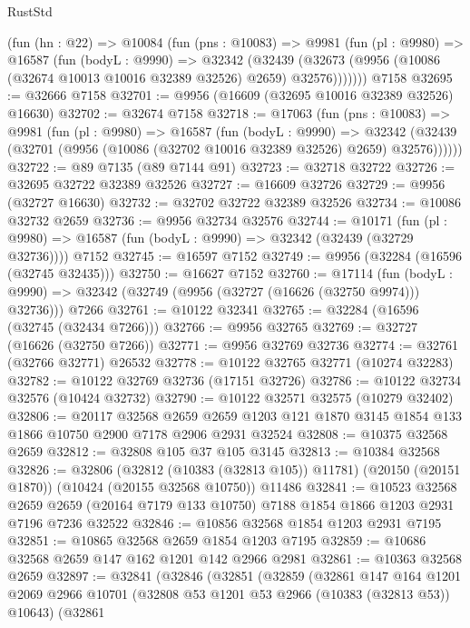 \begin{lexlean}{RustStd}
\begin{coremodule}
    (fun (hn : @22) =>
    @10084
      (fun (pns : @10083) =>
      @9981
        (fun (pl : @9980) =>
        @16587
          (fun (bodyL : @9990) =>
          @32342
            (@32439 (@32673 (@9956 (@10086 (@32674 @10013 @10016 @32389 @32526) @2659) @32576)))))))
    @7158
@32695 := @32666 @7158
@32701 := @9956 (@16609 (@32695 @10016 @32389 @32526) @16630)
@32702 := @32674 @7158
@32718 := @17063
    (fun (pns : @10083) =>
    @9981
      (fun (pl : @9980) =>
      @16587
        (fun (bodyL : @9990) =>
        @32342 (@32439 (@32701 (@9956 (@10086 (@32702 @10016 @32389 @32526) @2659) @32576))))))
@32722 := @89 @7135 (@89 @7144 @91)
@32723 := @32718 @32722
@32726 := @32695 @32722 @32389 @32526
@32727 := @16609 @32726
@32729 := @9956 (@32727 @16630)
@32732 := @32702 @32722 @32389 @32526
@32734 := @10086 @32732 @2659
@32736 := @9956 @32734 @32576
@32744 := @10171
    (fun (pl : @9980) => @16587 (fun (bodyL : @9990) => @32342 (@32439 (@32729 @32736))))
    @7152
@32745 := @16597 @7152
@32749 := @9956 (@32284 (@16596 (@32745 @32435)))
@32750 := @16627 @7152
@32760 := @17114
    (fun (bodyL : @9990) => @32342 (@32749 (@9956 (@32727 (@16626 (@32750 @9974))) @32736)))
    @7266
@32761 := @10122 @32341
@32765 := @32284 (@16596 (@32745 (@32434 @7266)))
@32766 := @9956 @32765
@32769 := @32727 (@16626 (@32750 @7266))
@32771 := @9956 @32769 @32736
@32774 := @32761 (@32766 @32771) @26532
@32778 := @10122 @32765 @32771 (@10274 @32283)
@32782 := @10122 @32769 @32736 (@17151 @32726)
@32786 := @10122 @32734 @32576 (@10424 @32732)
@32790 := @10122 @32571 @32575 (@10279 @32402)
@32806 := @20117
    @32568
    @2659
    @2659
    @1203
    @121
    @1870
    @3145
    @1854
    @133
    @1866
    @10750
    @2900
    @7178
    @2906
    @2931
    @32524
@32808 := @10375 @32568 @2659
@32812 := @32808 @105 @37 @105 @3145
@32813 := @10384 @32568
@32826 := @32806
    (@32812 (@10383 (@32813 @105)) @11781)
    (@20150 (@20151 @1870))
    (@10424 (@20155 @32568 @10750))
    @11486
@32841 := @10523
    @32568
    @2659
    @2659
    (@20164 @7179 @133 @10750)
    @7188
    @1854
    @1866
    @1203
    @2931
    @7196
    @7236
    @32522
@32846 := @10856 @32568 @1854 @1203 @2931 @7195
@32851 := @10865 @32568 @2659 @1854 @1203 @7195
@32859 := @10686 @32568 @2659 @147 @162 @1201 @142 @2966 @2981
@32861 := @10363 @32568 @2659
@32897 := @32841
    (@32846
      (@32851
        (@32859
          (@32861
            @147
            @164
            @1201
            @2069
            @2966
            @10701
            (@32808 @53 @1201 @53 @2966 (@10383 (@32813 @53)) @10643)
            (@32861

\end{coremodule}
\end{lexlean}
